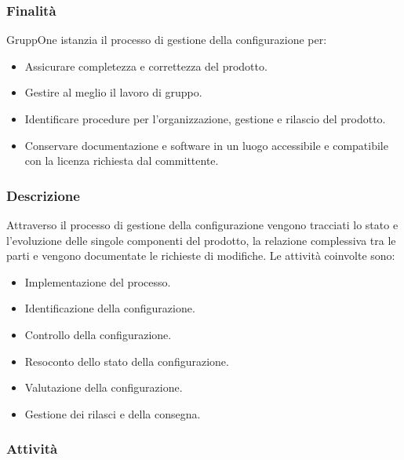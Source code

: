 \documentclass[../../norme-di-progetto.tex]{subfiles}
\begin{document}
\subsubsection{Finalità}%
\label{subs:gestione_della_configurazione/finalita}

GruppOne istanzia il processo di gestione della configurazione per:
\begin{itemize}
  \item Assicurare completezza e correttezza del prodotto.
  \item Gestire al meglio il lavoro di gruppo.
  \item Identificare procedure per l'organizzazione, gestione e rilascio del prodotto.
  \item Conservare documentazione e software in un luogo accessibile e compatibile con la licenza richiesta dal committente.
\end{itemize}

\subsubsection{Descrizione}%
\label{subs:gestione_della_configurazione/descrizione}

Attraverso il processo di gestione della configurazione vengono tracciati lo stato e l'evoluzione delle singole componenti del prodotto, la relazione complessiva tra le parti e vengono documentate le richieste di modifiche.
Le attività coinvolte sono:

\begin{itemize}
  \item Implementazione del processo.
  \item Identificazione della configurazione.
  \item Controllo della configurazione.
  \item Resoconto dello stato della configurazione.
  \item Valutazione della configurazione.
  \item Gestione dei rilasci e della consegna.
\end{itemize}

\subsubsection{Attività}%
\label{subs:gestione_della_configurazione/attivita}
\end{document}
